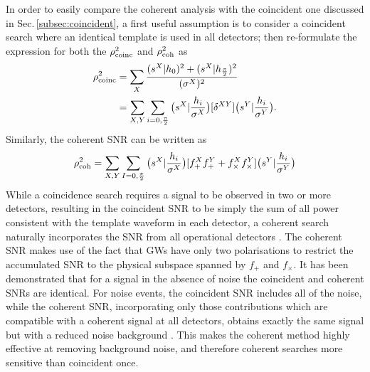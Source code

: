 \documentclass[binding=0.6cm, LaM]{sapthesis}
\begin{document}
	In order to easily compare the coherent analysis with the coincident one discussed in Sec.\,\ref{subsec:coincident},
	a first useful assumption is to consider a coincident search where an identical template is used in all detectors;
	then re-formulate the expression for both the $\rho^2_{\rm coinc}$ and $\rho^2_{\rm coh}$ as
        \begin{align}
          \label{eq:rhocoinc}
          \rho^2_{\rm coinc} &= \sum_{X} {{(s^X|h_0)^2+(s^X|h_{{\pi}\over{2}})^2} \over {(\sigma^X)^2}}  \\
          &= \sum_{X,Y}\sum_{i=0,{{\pi}\over{2}}}  \big(s^X|{{h_i}\over{\sigma^X}}\big)[\delta^{XY}]\big( s^Y|{{h_i}\over{\sigma^Y}}\big).
        \end{align}
	Similarly, the coherent SNR can be written as
        \begin{equation}
          \label{eq:rhocoh}
          \rho^2_{\rm coh}  = \sum_{X,Y}\sum_{I=0,{{\pi}\over{2}}}  \big(s^X|{{h_i}\over{\sigma^X}}\big)[f_{+}^Xf_{+}^Y+f_{\times}^Xf_{\times}^Y]\big( s^Y|{{h_i}\over{\sigma^Y}}\big)
        \end{equation}
	While a coincidence search requires a signal to be observed in two or more detectors, 
        resulting in the coincident SNR to be simply the sum of all power consistent with the template waveform in each detector,
        a coherent search naturally incorporates the SNR from all operational detectors \cite{45, 46}.
	The coherent SNR makes use of the fact that GWs have only two polarisations 
	to restrict the accumulated SNR to the physical subspace spanned by $f_+$ and $f_{\times}$. 
	It has been demonstrated that for a signal in the absence of noise the coincident and coherent SNRs are identical. 
        For noise events, the coincident SNR includes all of the noise, 
        while the coherent SNR, incorporating only those contributions which are compatible 
        with a coherent signal at all detectors, obtains exactly the same signal but with a reduced noise background \cite{45}.
        This makes the coherent method highly effective at removing background noise, and therefore coherent searches more sensitive than coincident once.
\end{document}
